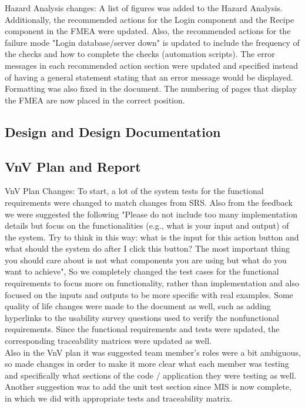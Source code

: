\documentclass{article}
\begin{document}
Hazard Analysis changes: A list of figures was added to the Hazard Analysis. Additionally, the recommended actions for the Login component and the Recipe component in the FMEA were updated. Also, the recommended actions for the failure mode "Login database/server down" is updated to include the frequency of the checks and how to complete the checks (automation scripts). The error messages in each recommended action section were updated and specified instead of having a general statement stating that an error message would be displayed. Formatting was also fixed in the document. The numbering of pages that display the FMEA are now placed in the correct position. 

\subsection{Design and Design Documentation}

\subsection{VnV Plan and Report}

VnV Plan Changes: To start, a lot of the system tests for the functional requirements were changed to match changes from SRS. Also from the feedback we were suggested the following "Please do not include too many implementation details but focus on the functionalities (e.g., what is your input and output) of the system. Try to think in this way: what is the input for this action button and what should the system do after I click this button? The most important thing you should care about is not what components you are using but what do you want to achieve", So we completely changed the test cases for the functional requirements to focus more on functionality, rather than implementation and also focused on the inputs and outputs to be more specific with real examples. Some quality of life changes were made to the document as well, such as adding hyperlinks to the usability survey questions used to verify the nonfunctional requirements. Since the functional requirements and tests were updated, the corresponding traceability matrices were updated as well. \\

Also in the VnV plan it was suggested team member's roles were a bit ambiguous, so made changes in order to make it more clear what each member was testing and specifically what sections of the code / application they were testing as well. Another suggestion was to add the unit test section since MIS is now complete, in which we did with appropriate tests and traceability matrix. \\
\end{document}
